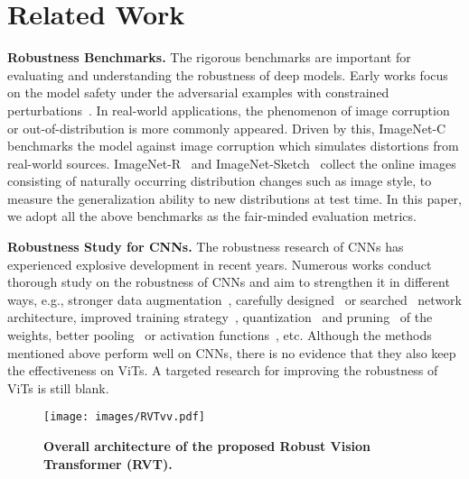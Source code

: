 \documentclass[10pt,twocolumn,letterpaper]{article}
\begin{document}
\section{Related Work}
\label{sec:2}
\textbf{Robustness Benchmarks.} The rigorous benchmarks are important for evaluating and understanding the robustness of deep models. Early works focus on the model safety under the adversarial examples with constrained perturbations~\cite{goodfellow2014explaining, szegedy2013intriguing}. In real-world applications, the phenomenon of image corruption or out-of-distribution is more commonly appeared. 
Driven by this, ImageNet-C~\cite{hendrycks2019benchmarking} benchmarks the model against image corruption which simulates distortions from real-world sources. ImageNet-R~\cite{hendrycks2020many} and ImageNet-Sketch~\cite{wang2019learning} collect the online images consisting of naturally occurring distribution changes such as image style, to measure the generalization ability to new distributions at test time. In this paper, we adopt all the above benchmarks as the fair-minded evaluation metrics.

\textbf{Robustness Study for CNNs.} The robustness research of CNNs has experienced explosive development in recent years. Numerous works conduct thorough study on the robustness of CNNs and aim to strengthen it in different ways, e.g., stronger data augmentation~\cite{hendrycks2020many, hendrycks2019augmix, rusak2020simple}, carefully designed~\cite{su2018robustness, wu2020wider} or searched~\cite{guo2020meets, dong2020adversarially} network architecture, improved training strategy~\cite{madry2017towards, li2020shape, xie2020self}, quantization~\cite{lin2019defensive} and pruning~\cite{ye2019adversarial} of the weights, better pooling~\cite{zhang2019making, vasconcelos2020effective} or activation functions~\cite{xie2020smooth}, etc. Although the methods mentioned above perform well on CNNs, there is no evidence that they also keep the effectiveness on ViTs. A targeted research for improving the robustness of ViTs is still blank. 

\begin{figure*}
    \centering
    \texttt{[image: images/RVTvv.pdf]}
    \vspace{-4.5mm}
    \caption{\textbf{Overall architecture of the proposed Robust Vision Transformer (RVT).}}
    \label{fig:overall_arch}
    \vspace{-3.5mm}
\end{figure*}
\end{document}
